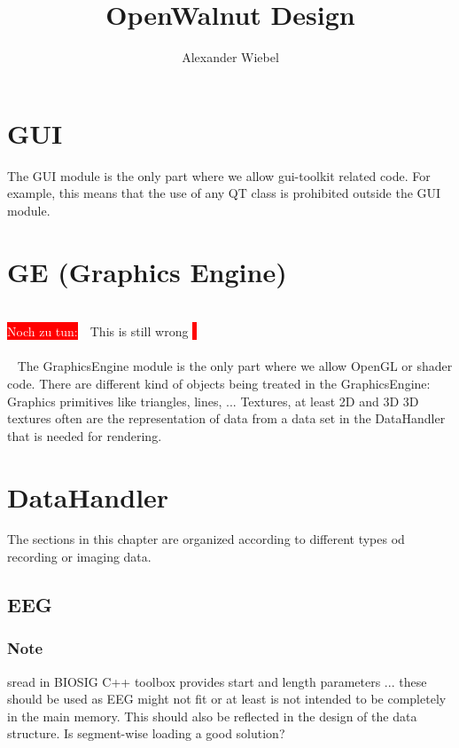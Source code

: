 \documentclass[a4paper,12pt]{scrbook}
\newcommand{\todo}[1]{\textcolor{white}{\colorbox{red}{\\ Noch zu %
      tun:}}\ \ #1 \textcolor{red}{\colorbox{red}{I}}\\\ \\\ }
\begin{document}
\titlehead{
  OpenWalnut Project\\
  www.openwalnut.org}

\subject{Documentation}
\title{
  OpenWalnut Design
}
\author{ Alexander Wiebel }
\publishers{Leipzig}
\maketitle

\tableofcontents

\chapter{GUI}
The GUI module is the only part where we allow gui-toolkit related code. For example, this means that the use of any QT class is prohibited outside the GUI module.
\chapter{GE (Graphics Engine)}
\todo{This is still wrong}
The GraphicsEngine module is the only part where we allow OpenGL or shader code. 
 There are different kind of objects being treated in the GraphicsEngine: 
Graphics primitives like triangles, lines, ... 
Textures, at least 2D and 3D 
3D textures often are the representation of data from a data set in the DataHandler that is needed for rendering.
\chapter{DataHandler}
The sections in this chapter are organized according to different
types od recording or imaging data.
\section{EEG}
\subsection{Note}
 sread in BIOSIG C++ toolbox provides start and length parameters ... these should be used as EEG might not fit or at least is not intended to be completely in the main memory. This should also be reflected in the design of the data structure.
 Is segment-wise loading a good solution?
\end{document}
